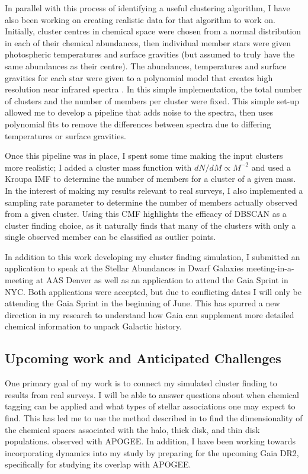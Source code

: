 \documentclass[11pt]{article}
\begin{document}
    In parallel with this process of identifying a useful clustering algorithm, I have also been working on creating realistic data for that algorithm to work on. Initially, cluster centres in chemical space were chosen from a normal distribution in each of their chemical abundances, then individual member stars were given photospheric temperatures and surface gravities (but assumed to truly have the same abundances as their centre). The abundances, temperatures and surface gravities for each star were given to a polynomial model that creates high resolution near infrared spectra \citep{Rix2016}. In this simple implementation, the total number of clusters and the number of members per cluster were fixed. This simple set-up allowed me to develop a pipeline that adds noise to the spectra, then uses polynomial fits to remove the differences between spectra due to differing temperatures or surface gravities.
    
    Once this pipeline was in place, I spent some time making the input clusters more realistic; I added a cluster mass function with $dN/dM\propto M^{-2}$ and used a Kroupa IMF to determine the number of members for a cluster of a given mass. In the interest of making my results relevant to real surveys, I also implemented a sampling rate parameter to determine the number of members actually observed from a given cluster. Using this CMF highlights the efficacy of DBSCAN as a cluster finding choice, as it naturally finds that many of the clusters with only a single observed member can be classified as outlier points.
    
    In addition to this work developing my cluster finding simulation, I submitted an application to speak at the Stellar Abundances in Dwarf Galaxies meeting-in-a-meeting at AAS Denver as well as an application to attend the Gaia Sprint in NYC. Both applications were accepted, but due to conflicting dates I will only be attending the Gaia Sprint in the beginning of June. This has spurred a new direction in my research to understand how Gaia can supplement more detailed chemical information to unpack Galactic history.
  
    
    \subsection*{Upcoming work and Anticipated Challenges} 
    
    One primary goal of my work is to connect my simulated cluster finding to results from real surveys. I will be able to answer questions about when chemical tagging can be applied and what types of stellar associations one may expect to find. This has led me to use the method described in \citet{Price-Jones2018} to find the dimensionality of the chemical spaces associated with the halo, thick disk, and thin disk populations. observed with APOGEE. In addition, I have been working towards incorporating dynamics into my study by preparing for the upcoming Gaia DR2, specifically for studying its overlap with APOGEE.
    
\end{document}
